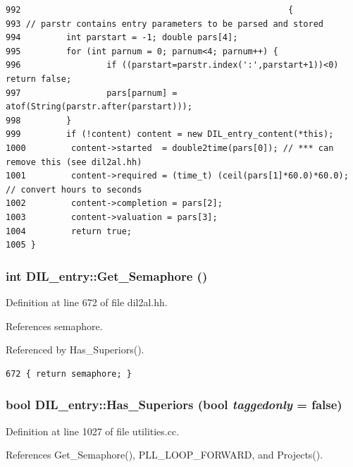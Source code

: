 \footnotesize\begin{verbatim}992                                                     {
993 // parstr contains entry parameters to be parsed and stored
994         int parstart = -1; double pars[4];
995         for (int parnum = 0; parnum<4; parnum++) {
996                 if ((parstart=parstr.index(':',parstart+1))<0) return false;
997                 pars[parnum] = atof(String(parstr.after(parstart)));
998         }
999         if (!content) content = new DIL_entry_content(*this);
1000         content->started  = double2time(pars[0]); // *** can remove this (see dil2al.hh)
1001         content->required = (time_t) (ceil(pars[1]*60.0)*60.0); // convert hours to seconds
1002         content->completion = pars[2];
1003         content->valuation = pars[3];
1004         return true;
1005 }
\end{verbatim}\normalsize 
{}
\subsubsection{\setlength{\rightskip}{0pt plus 5cm}int DIL\_\-entry::Get\_\-Semaphore ()\hspace{0.3cm}{\tt  [inline]}}\label{classDIL__entry_a9}




Definition at line 672 of file dil2al.hh.

References semaphore.

Referenced by Has\_\-Superiors().



\footnotesize\begin{verbatim}672 { return semaphore; }
\end{verbatim}\normalsize 
{}
\subsubsection{\setlength{\rightskip}{0pt plus 5cm}bool DIL\_\-entry::Has\_\-Superiors (bool {\em taggedonly} = {\bf false})}\label{classDIL__entry_a20}




Definition at line 1027 of file utilities.cc.

References Get\_\-Semaphore(), PLL\_\-LOOP\_\-FORWARD, and Projects().



